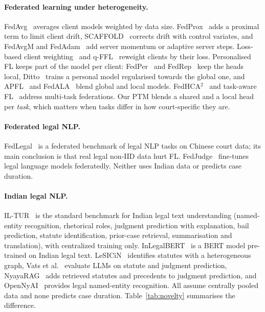 \documentclass[11pt,a4paper]{article}
\begin{document}
\paragraph{Federated learning under heterogeneity.} FedAvg~\cite{mcmahan2017communication} averages
client models weighted by data size. FedProx~\cite{li2020federated} adds a proximal term to limit
client drift, SCAFFOLD~\cite{karimireddy2020scaffold} corrects drift with control variates, and
FedAvgM and FedAdam~\cite{hsu2019fedavgm,reddi2021adaptive} add server momentum or adaptive server
steps. Loss-based client weighting~\cite{fedlbw2026} and q-FFL~\cite{li2020qffl} reweight clients
by their loss. Personalised FL keeps part of the model per client: FedPer~\cite{arivazhagan2019fedper}
and FedRep~\cite{collins2021fedrep} keep the heads local, Ditto~\cite{li2021ditto} trains a personal
model regularised towards the global one, and APFL~\cite{deng2020apfl} and FedALA~\cite{zhang2023fedala}
blend global and local models. FedHCA$^2$~\cite{lu2024fedhca2} and task-aware FL~\cite{taskawarefl2025}
address multi-task federations. Our PTM blends a shared and a local head per \emph{task}, which matters
when tasks differ in how court-specific they are.

\paragraph{Federated legal NLP.} FedLegal~\cite{zhang2023fedlegal} is a federated benchmark of legal
NLP tasks on Chinese court data; its main conclusion is that real legal non-IID data hurt FL.
FedJudge~\cite{yue2023fedjudge} fine-tunes legal language models federatedly. Neither uses Indian data
or predicts case duration.

\paragraph{Indian legal NLP.} IL-TUR~\cite{joshi2024iltur} is the standard benchmark for Indian legal
text understanding (named-entity recognition, rhetorical roles, judgment prediction with explanation,
bail prediction, statute identification, prior-case retrieval, summarisation and translation), with
centralized training only. InLegalBERT~\cite{paul2023inlegalbert} is a BERT model pre-trained on
Indian legal text. LeSICiN~\cite{paul2022lesicin} identifies statutes with a heterogeneous graph,
Vats et al.~\cite{vats2023llms} evaluate LLMs on statute and judgment prediction, NyayaRAG~\cite{nigam2025nyayarag}
adds retrieved statutes and precedents to judgment prediction, and OpenNyAI~\cite{kalamkar2022ner}
provides legal named-entity recognition. All assume centrally pooled data and none predicts case
duration. Table~\ref{tab:novelty} summarises the difference.
\end{document}
